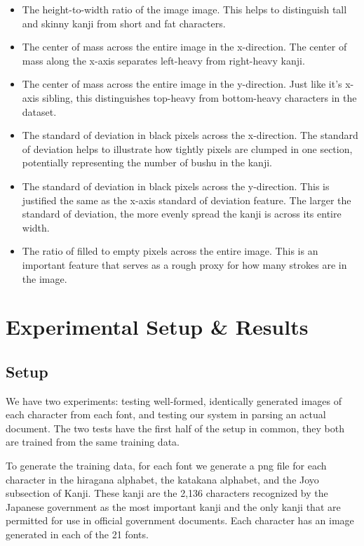 \documentclass[10pt,twocolumn,letterpaper]{article}
\begin{document}
\begin{itemize}
    \item The height-to-width ratio of the image image. This helps to distinguish tall and skinny kanji from short and fat characters.
    \item The center of mass across the entire image in the x-direction. The center of mass along the x-axis separates left-heavy from right-heavy kanji.
    \item The center of mass across the entire image in the y-direction. Just like it’s x-axis sibling, this distinguishes top-heavy from bottom-heavy characters in the dataset.
    \item The standard of deviation in black pixels across the x-direction. The standard of deviation helps to illustrate how tightly pixels are clumped in one section, potentially representing the number of bushu in the kanji.
    \item The standard of deviation in black pixels across the y-direction. This is justified the same as the x-axis standard of deviation feature. The larger the standard of deviation, the more evenly spread the kanji is across its entire width.
    \item The ratio of filled to empty pixels across the entire image. This is an important feature that serves as a rough proxy for how many strokes are in the image.
\end{itemize}

\section{Experimental Setup \& Results}
\subsection{Setup}
We have two experiments: testing well-formed, identically generated images of each character from each font, and testing our system in parsing an actual document. The two tests have the first half of the setup in common, they both are trained from the same training data.

To generate the training data, for each font we generate a png file for each character in the hiragana alphabet, the katakana alphabet, and the Joyo subsection of Kanji. These kanji are the 2,136 characters recognized by the Japanese government as the most important kanji and the only kanji that are permitted for use in official government documents. Each character has an image generated in each of the 21 fonts.
\end{document}
